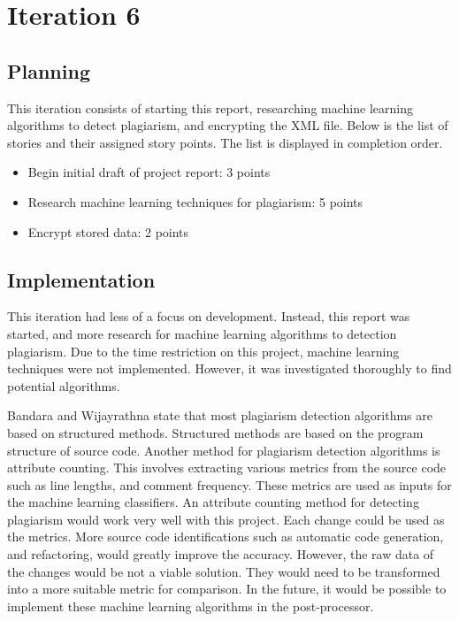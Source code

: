\chapter{Iteration 6}
\section{Planning}
This iteration consists of starting this report, researching machine learning algorithms to detect plagiarism, and encrypting the XML file. Below is the list of stories and their assigned story points. The list is displayed in completion order.

\begin{itemize}
\item Begin initial draft of project report: 3 points
\item Research machine learning techniques for plagiarism: 5 points
\item Encrypt stored data: 2 points
\end{itemize}

\section{Implementation}
This iteration had less of a focus on development. Instead, this report was started, and more research for machine learning algorithms to detection plagiarism. Due to the time restriction on this project, machine learning techniques were not implemented. However, it was investigated thoroughly to find potential algorithms.

Bandara and Wijayrathna state that most plagiarism detection algorithms are based on structured methods\cite{Bandara2012}. Structured methods are based on the program structure of source code. Another method for plagiarism detection algorithms is attribute counting. This involves extracting various metrics from the source code such as line lengths, and comment frequency. These metrics are used as inputs for the machine learning classifiers. An attribute counting method for detecting plagiarism would work very well with this project. Each change could be used as the metrics. More source code identifications such as automatic code generation, and refactoring, would greatly improve the accuracy. However, the raw data of the changes would be not a viable solution. They would need to be transformed into a more suitable metric for comparison. In the future, it would be possible to implement these machine learning algorithms in the post-processor.

